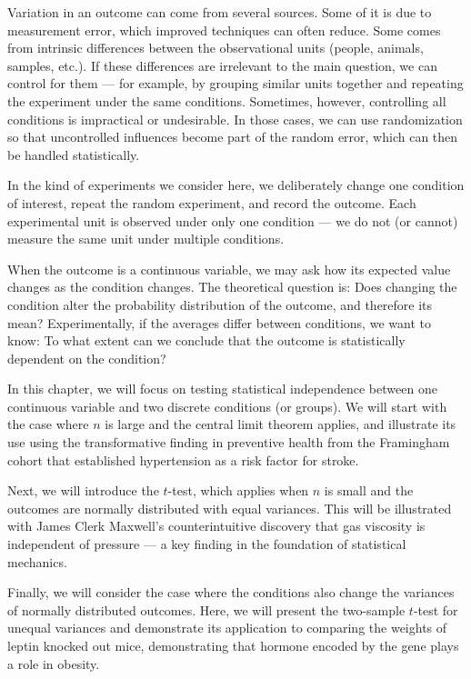\documentclass[
]{book}
\begin{document}
Variation in an outcome can come from several sources. Some of it is due to measurement error, which improved techniques can often reduce. Some comes from intrinsic differences between the observational units (people, animals, samples, etc.). If these differences are irrelevant to the main question, we can control for them --- for example, by grouping similar units together and repeating the experiment under the same conditions. Sometimes, however, controlling all conditions is impractical or undesirable. In those cases, we can use randomization so that uncontrolled influences become part of the random error, which can then be handled statistically.

In the kind of experiments we consider here, we deliberately change one condition of interest, repeat the random experiment, and record the outcome. Each experimental unit is observed under only one condition --- we do not (or cannot) measure the same unit under multiple conditions.

When the outcome is a continuous variable, we may ask how its expected value changes as the condition changes. The theoretical question is: Does changing the condition alter the probability distribution of the outcome, and therefore its mean? Experimentally, if the averages differ between conditions, we want to know: To what extent can we conclude that the outcome is statistically dependent on the condition?

In this chapter, we will focus on testing statistical independence between one continuous variable and two discrete conditions (or groups). We will start with the case where \(n\) is large and the central limit theorem applies, and illustrate its use using the transformative finding in preventive health from the Framingham cohort that established hypertension as a risk factor for stroke.

Next, we will introduce the \(t\)-test, which applies when \(n\) is small and the outcomes are normally distributed with equal variances. This will be illustrated with James Clerk Maxwell's counterintuitive discovery that gas viscosity is independent of pressure --- a key finding in the foundation of statistical mechanics.

Finally, we will consider the case where the conditions also change the variances of normally distributed outcomes. Here, we will present the two-sample \(t\)-test for unequal variances and demonstrate its application to comparing the weights of leptin knocked out mice, demonstrating that hormone encoded by the gene plays a role in obesity.
\end{document}
